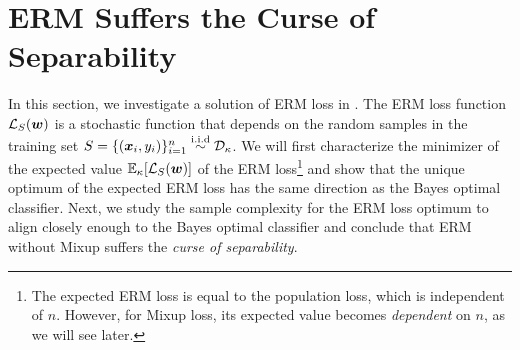 \section{ERM Suffers the Curse of Separability}\label{section:ERM}
In this section, we investigate a solution of ERM loss in .
The ERM loss function $\mathcal{L}_S({\bm{w}})$ is a stochastic function that depends on the random samples in the training set $S = \{({\bm{x}}_i, y_i)\}_{i=1}^n \overset{\mathrm{i.i.d}}{\sim} \mathcal{D}_\kappa$. 
We will first characterize the minimizer of the expected value $\mathbb{E}_\kappa[\mathcal{L}_S({\bm{w}})]$ of the ERM loss\footnote{The expected ERM loss is equal to the population loss, which is independent of $n$. However, for Mixup loss, its expected value becomes \emph{dependent} on $n$, as we will see later.} and show that the unique optimum of the expected ERM loss has the same direction as the Bayes optimal classifier. Next, we study the sample complexity for the ERM loss optimum to align closely enough to the Bayes optimal classifier and conclude that ERM without Mixup suffers the \emph{curse of separability}.

